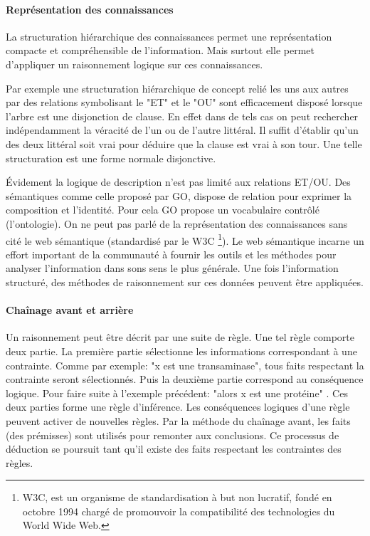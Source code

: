\begin{refsegment}
    \paragraph{Représentation des connaissances}
    La structuration hiérarchique des connaissances permet une représentation compacte et compréhensible de l'information. Mais surtout elle permet d'appliquer un raisonnement logique sur ces connaissances.
    
    Par exemple une structuration hiérarchique de concept relié les uns aux autres par des relations symbolisant le "ET" et le "OU" sont efficacement disposé lorsque l'arbre est une disjonction de clause.
    En effet dans de tels cas on peut rechercher indépendamment la véracité de l'un ou de l'autre littéral. Il suffit d'établir qu'un des deux littéral soit vrai pour déduire que la clause est vrai à son tour. Une telle structuration est une forme normale disjonctive.
    
    Évidement la logique de description n'est pas limité aux relations ET/OU. Des sémantiques comme celle proposé par \gls{GO}, dispose de relation pour exprimer la composition et l'identité. Pour cela  \gls{GO} propose un vocabulaire contrôlé (l'ontologie). On ne peut pas parlé de la représentation des connaissances sans cité le web sémantique (standardisé par le W3C \footnote{W3C, est un organisme de standardisation à but non lucratif, fondé en octobre 1994 chargé de promouvoir la compatibilité des technologies du World Wide Web.}). Le web sémantique incarne un effort important de la communauté à fournir les outils et les méthodes pour analyser l'information dans sons sens le plus générale. Une fois l'information structuré, des méthodes de raisonnement sur ces données peuvent être appliquées.
    
    \paragraph{Chaînage avant et arrière} %
    Un raisonnement peut être décrit par une suite de règle. Une tel règle comporte deux partie. La première partie sélectionne les informations correspondant à une contrainte. Comme par exemple: "x est une transaminase", tous faits respectant la contrainte seront sélectionnés. Puis la deuxième partie correspond au conséquence logique. Pour faire suite à l'exemple précédent: "alors x est une protéine" . Ces deux parties forme une règle d'inférence. Les conséquences logiques d'une règle peuvent activer de nouvelles règles. Par la méthode du chaînage avant, les faits (des prémisses) sont utilisés pour remonter aux conclusions. Ce processus de déduction se poursuit tant qu'il existe des faits respectant les contraintes des règles.
    

\end{refsegment}
